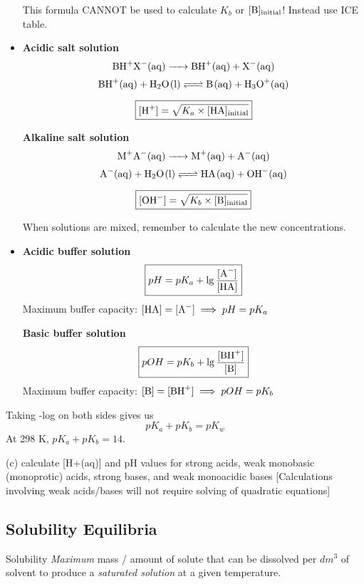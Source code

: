 \begin{itemize}
\begin{remark}
This formula CANNOT be used to calculate $K_b$ or $[\ce{B}]_\text{initial}$! Instead use ICE table.
\end{remark}

\item \textbf{Acidic salt solution}
\[ \ce{BH+X-(aq) -> BH+(aq) + X-(aq)} \]
\[ \ce{BH+(aq) + H2O(l) <=> B(aq) + H3O+(aq)} \]

\[ \boxed{[\ce{H+}]=\sqrt{K_a\times[\ce{HA}]_\text{initial}}} \]

\vspace{5mm}

\textbf{Alkaline salt solution}
\[ \ce{M+A-(aq) -> M+(aq) + A-(aq)} \]
\[ \ce{A-(aq) + H2O(l) <=> HA(aq) + OH-(aq)} \]

\[ \boxed{[\ce{OH-}]=\sqrt{K_b\times[\ce{B}]_\text{initial}}} \]

\begin{remark}
When solutions are mixed, remember to calculate the new concentrations.
\end{remark}

\item \textbf{Acidic buffer solution}
\[ \boxed{pH = pK_a + \lg\frac{[\ce{A-}]}{[\ce{HA}]}} \]
Maximum buffer capacity: $[\ce{HA}]=[\ce{A-}] \implies pH=pK_a$

\vspace{5mm}

\textbf{Basic buffer solution}
\[ \boxed{pOH = pK_b + \lg\frac{[\ce{BH+}]}{[\ce{B}]}} \]
Maximum buffer capacity: $[\ce{B}]=[\ce{BH+}] \implies pOH=pK_b$

\end{itemize}

Taking -log on both sides gives us
\begin{equation}
pK_a + pK_b = pK_w
\end{equation}
At 298 K, $pK_a+pK_b=14$.

(c) calculate [H+(aq)] and pH values for strong acids, weak monobasic (monoprotic) acids, strong bases, and weak monoacidic bases [Calculations involving weak acids/bases will not require solving of quadratic equations]


\pagebreak

\subsection{Solubility Equilibria}
\begin{defn}{Solubility}{}
\emph{Maximum} mass / amount of solute that can be dissolved per $\unit{dm^3}$ of solvent to produce a \emph{saturated solution} at a given temperature.
\end{defn}

